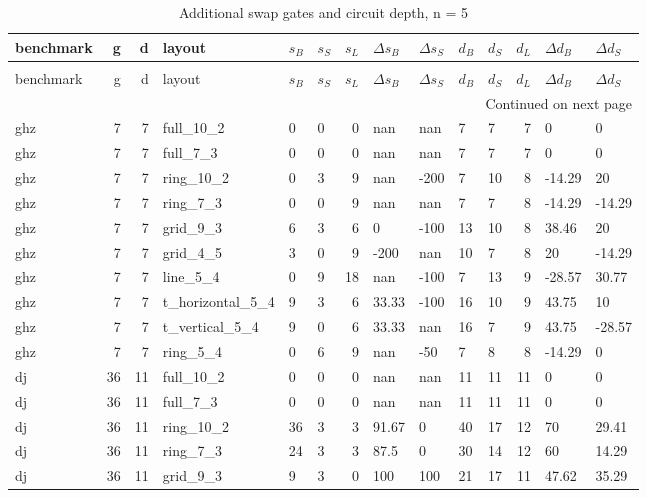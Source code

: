 \begin{longtable}{lrrlllrllllrll}
\caption{Additional swap gates and circuit depth, n = 5} \label{benchmark-table-5} \\
\toprule
benchmark & g & d & layout & $s_B$ & $s_S$ & $s_L$ & $\Delta s_B$ & $\Delta s_S$ & $d_B$ & $d_S$ & $d_L$ & $\Delta d_B$ & $\Delta d_S$ \\
\midrule
\endfirsthead
\caption[]{Additional swap gates and circuit depth, n = 5} \\
\toprule
benchmark & g & d & layout & $s_B$ & $s_S$ & $s_L$ & $\Delta s_B$ & $\Delta s_S$ & $d_B$ & $d_S$ & $d_L$ & $\Delta d_B$ & $\Delta d_S$ \\
\midrule
\endhead
\midrule
\multicolumn{14}{r}{Continued on next page} \\
\midrule
\endfoot
\bottomrule
\endlastfoot
ghz & 7 & 7 & full\_10\_2 & 0 & 0 & 0 & nan & nan & 7 & 7 & 7 & 0 & 0 \\
ghz & 7 & 7 & full\_7\_3 & 0 & 0 & 0 & nan & nan & 7 & 7 & 7 & 0 & 0 \\
ghz & 7 & 7 & ring\_10\_2 & 0 & 3 & 9 & nan & -200 & 7 & 10 & 8 & -14.29 & 20 \\
ghz & 7 & 7 & ring\_7\_3 & 0 & 0 & 9 & nan & nan & 7 & 7 & 8 & -14.29 & -14.29 \\
ghz & 7 & 7 & grid\_9\_3 & 6 & 3 & 6 & 0 & -100 & 13 & 10 & 8 & 38.46 & 20 \\
ghz & 7 & 7 & grid\_4\_5 & 3 & 0 & 9 & -200 & nan & 10 & 7 & 8 & 20 & -14.29 \\
ghz & 7 & 7 & line\_5\_4 & 0 & 9 & 18 & nan & -100 & 7 & 13 & 9 & -28.57 & 30.77 \\
ghz & 7 & 7 & t\_horizontal\_5\_4 & 9 & 3 & 6 & 33.33 & -100 & 16 & 10 & 9 & 43.75 & 10 \\
ghz & 7 & 7 & t\_vertical\_5\_4 & 9 & 0 & 6 & 33.33 & nan & 16 & 7 & 9 & 43.75 & -28.57 \\
ghz & 7 & 7 & ring\_5\_4 & 0 & 6 & 9 & nan & -50 & 7 & 8 & 8 & -14.29 & 0 \\
dj & 36 & 11 & full\_10\_2 & 0 & 0 & 0 & nan & nan & 11 & 11 & 11 & 0 & 0 \\
dj & 36 & 11 & full\_7\_3 & 0 & 0 & 0 & nan & nan & 11 & 11 & 11 & 0 & 0 \\
dj & 36 & 11 & ring\_10\_2 & 36 & 3 & 3 & 91.67 & 0 & 40 & 17 & 12 & 70 & 29.41 \\
dj & 36 & 11 & ring\_7\_3 & 24 & 3 & 3 & 87.5 & 0 & 30 & 14 & 12 & 60 & 14.29 \\
dj & 36 & 11 & grid\_9\_3 & 9 & 3 & 0 & 100 & 100 & 21 & 17 & 11 & 47.62 & 35.29 \\

\end{longtable}
